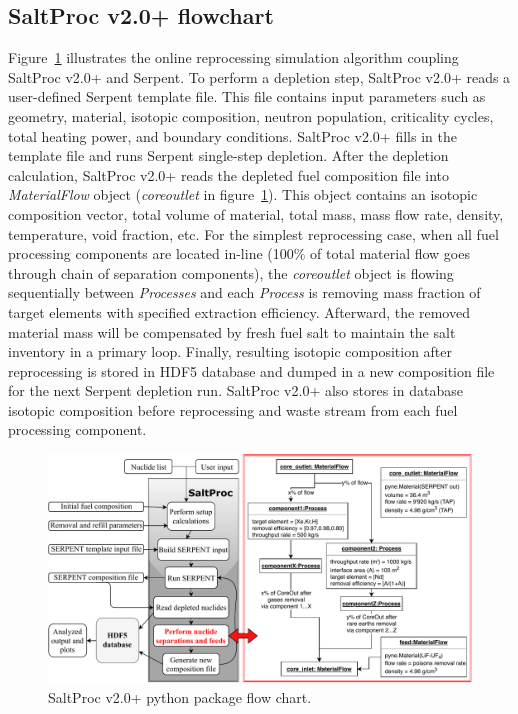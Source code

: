 \documentclass[12pt]{article} %
\begin{document}
\subsection{SaltProc v2.0+ flowchart}
Figure~\ref{fig:saltproc_flow} illustrates the online reprocessing simulation 
algorithm coupling SaltProc v2.0+ and Serpent. To perform a depletion step, 
SaltProc v2.0+ reads a user-defined Serpent template file. This file contains input 
 parameters such as geometry, material, isotopic composition, neutron 
population, criticality cycles, total heating power, and boundary conditions. 
SaltProc v2.0+ fills in the template file and runs Serpent single-step depletion. 
After the depletion calculation, SaltProc v2.0+ reads the depleted fuel composition 
file into \textit{MaterialFlow} object (\textit{core\textunderscore outlet} in 
figure~\ref{fig:saltproc_flow}). This object contains an isotopic composition 
vector, total volume of material, total mass, mass flow rate, density, temperature, 
void fraction, etc. For the simplest reprocessing case, when all fuel processing components are located in-line 
(100\% of total material flow goes through 
chain of separation components), the \textit{core\textunderscore outlet} object is flowing 
sequentially between \textit{Processes} and each \textit{Process} is 
removing mass fraction of target elements with specified extraction 
efficiency. Afterward, the removed material mass will be compensated by 
fresh fuel salt to maintain the salt inventory in a primary loop. 
Finally, resulting isotopic composition after reprocessing is stored in 
HDF5 database and dumped in a new composition file for the next 
Serpent depletion run. SaltProc v2.0+ also stores in database isotopic composition 
before reprocessing and waste stream from each fuel processing component. 
\begin{figure}[ht!] %
	\centering
  \includegraphics[width=1.03\textwidth]{saltproc_flowchart.pdf}
  \caption{SaltProc v2.0+ python package flow chart.}
  \label{fig:saltproc_flow}
\end{figure}
\end{document}
